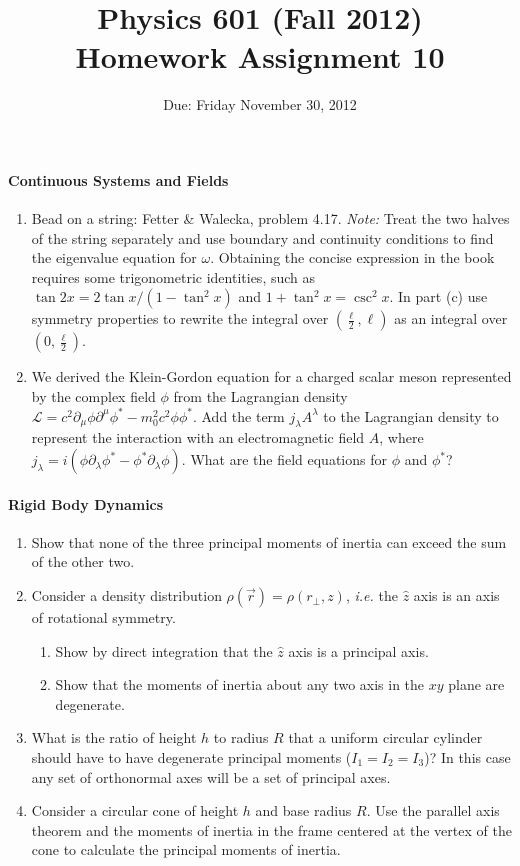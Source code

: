 \documentclass[letterpaper,11pt]{article}
\title{Physics 601 (Fall 2012) \\ Homework Assignment 10}
\date{Due: Friday November 30, 2012}
\begin{document}
\maketitle

\paragraph*{Continuous Systems and Fields}
\begin{enumerate}[resume]
 \item Bead on a string: Fetter \& Walecka, problem 4.17. \emph{Note:} Treat the two halves of the string separately and use boundary and continuity conditions to find the eigenvalue equation for $\omega$.  Obtaining the concise expression in the book requires some trigonometric identities, such as $\tan 2x = 2 \tan x / (1-\tan^2 x)$ and $1 + \tan^2 x = \csc^2 x$.  In part (c) use symmetry properties to rewrite the integral over $(\frac{\ell}{2},\ell)$ as an integral over $(0,\frac{\ell}{2})$.
 \item We derived the Klein-Gordon equation for a charged scalar meson represented by the complex field $\phi$ from the Lagrangian density $\mathcal{L} = c^2 \partial_\mu \phi \partial^\mu \phi^* - m_0^2 c^2 \phi \phi^*$.  Add the term $j_\lambda A^\lambda$ to the Lagrangian density to represent the interaction with an electromagnetic field $A$, where $j_\lambda = i(\phi \partial_\lambda \phi^* - \phi^* \partial_\lambda \phi)$.  What are the field equations for $\phi$ and $\phi^*$?
\end{enumerate}

\paragraph*{Rigid Body Dynamics}
\begin{enumerate}
 \item Show that none of the three principal moments of inertia can exceed the sum of the other two.
 \item Consider a density distribution $\rho(\vec{r}) = \rho(r_\perp,z)$, \textit{i.e.} the $\hat{z}$ axis is an axis of rotational symmetry.
 \begin{enumerate}
  \item Show by direct integration that the $\hat{z}$ axis is a principal axis.
  \item Show that the moments of inertia about any two axis in the $xy$ plane are degenerate.
 \end{enumerate}
 \item What is the ratio of height $h$ to radius $R$ that a uniform circular cylinder should have to have degenerate principal moments ($I_1 = I_2 = I_3$)?  In this case any set of orthonormal axes will be a set of principal axes.
 \item Consider a circular cone of height $h$ and base radius $R$.  Use the parallel axis theorem and the moments of inertia in the frame centered at the vertex of the cone to calculate the principal moments of inertia.
\end{enumerate}
\end{document}

